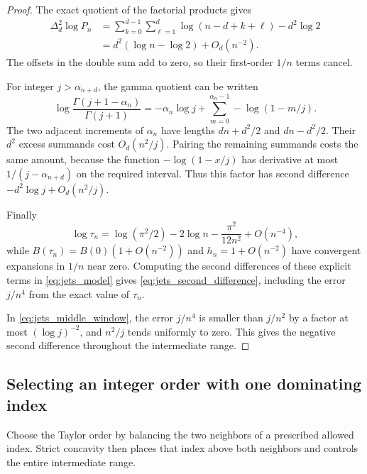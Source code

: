 \documentclass[11pt]{article}
\numberwithin{equation}{section}
\theoremstyle{definition}
\begin{document}
\begin{proof}
The exact quotient of the factorial products gives
\begin{align*}
 \Delta_d^2\log P_n
 &=\sum_{k=0}^{d-1}\sum_{\ell=1}^d
       \log(n-d+k+\ell)-d^2\log2\\
 &=d^2(\log n-\log2)+O_d(n^{-2}).
\end{align*}
The offsets in the double sum add to zero, so their first-order
$1/n$ terms cancel.

For integer $j>\alpha_{n+d}$, the gamma quotient can be written
\[
 \log\frac{\Gamma(j+1-\alpha_n)}{\Gamma(j+1)}
 =-\alpha_n\log j+
   \sum_{m=0}^{\alpha_n-1}-\log(1-m/j).
\]
The two adjacent increments of $\alpha_n$ have lengths
$dn+d^2/2$ and $dn-d^2/2$. Their $d^2$ excess summands cost
$O_d(n^2/j)$. Pairing the remaining summands costs the same amount,
because the function $-\log(1-x/j)$ has derivative at most
$1/(j-\alpha_{n+d})$ on the required interval. Thus this factor has
second difference $-d^2\log j+O_d(n^2/j)$.

Finally
\[
 \log\tau_n=\log(\pi^2/2)-2\log n
             -\frac{\pi^2}{12n^2}+O(n^{-4}),
\]
while $B(\tau_n)=B(0)(1+O(n^{-2}))$ and $h_n=1+O(n^{-2})$
have convergent expansions in $1/n$ near zero. Computing the
second differences of these explicit terms in
\eqref{eq:jets_model} gives
\eqref{eq:jets_second_difference}, including the error $j/n^4$
from the exact value of $\tau_n$.

In \eqref{eq:jets_middle_window}, the error $j/n^4$ is smaller than
$j/n^2$ by a factor at most $(\log j)^{-2}$, and $n^2/j$ tends
uniformly to zero. This gives the negative second difference
throughout the intermediate range.
\end{proof}

\subsection{Selecting an integer order with one dominating index}

Choose the Taylor order by balancing the two neighbors of a prescribed
allowed index. Strict concavity then places that index above both
neighbors and controls the entire intermediate range.
\end{document}
